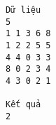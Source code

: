 \begin{verbatim}
Dữ liệu
5
1 1 3 6 8
1 2 2 5 5
4 4 0 3 3
8 0 2 3 4
4 3 0 2 1

Kết quả
2
\end{verbatim}